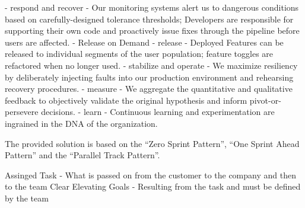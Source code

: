   - respond and recover
    - Our monitoring systems alert us to dangerous conditions based on carefully-designed tolerance thresholds; Developers are responsible for supporting their own code and proactively issue fixes through the pipeline before users are affected.
- Release on Demand
  - release
    - Deployed Features can be released to individual segments of the user population; feature toggles are refactored when no longer used.
  - stabilize and operate
    - We maximize resiliency by deliberately injecting faults into our production environment and rehearsing recovery procedures.
  - measure
    - We aggregate the quantitative and qualitative feedback to objectively validate the original hypothesis and inform pivot-or- persevere decisions.
  - learn
    - Continuous learning and experimentation are ingrained in the DNA of the organization.
\citep{HumanCen72:online}

The provided solution is based on the “Zero Sprint Pattern”, “One Sprint Ahead Pattern” and the “Parallel Track Pattern”.
\citep{Forbrig2015ManagingTA}

Assinged Task
- What is passed on from the customer to the company and then to the team
Clear Elevating Goals
- Resulting from the task and must be defined by the team